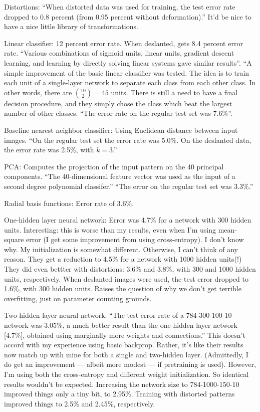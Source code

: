 \documentclass[12pt]{report}
\begin{document}
Distortions: ``When distorted data was used for training, the test
error rate dropped to 0.8 percent (from 0.95 percent without
deformation).''  It'd be nice to have a nice little library of
transformations.

Linear classifier: 12 percent error rate. When deslanted, gets 8.4
percent error rate.  ``Various combinations of sigmoid units, linear
units, gradient descent learning, and learning by directly solving
linear systems gave similar results''.  ``A simple improvement of the
basic linear classifier was tested.  The idea is to train each unit of
a single-layer network to separate each class from each other class.
In other words, there are ${10 \choose 2} = 45$ units.  There is still
a need to have a final decision procedure, and they simply chose the
class which beat the largest number of other classes.  ``The error
rate on the regular test set was 7.6\%''.

Baseline nearest neighbor classifier: Using Euclidean distance between
input images.  ``On the regular test set the error rate was 5.0\%.  On
the deslanted data, the error rate was 2.5\%, with $k = 3$.''

PCA: Computes the projection of the input pattern on the 40 principal
components.  ``The 40-dimensional feature vector was used as the input
of a second degree polynomial classifer.''  ``The error on the regular
test set was 3.3\%.''

Radial basis functions: Error rate of 3.6\%.

One-hidden layer neural network: Error was 4.7\% for a network with
300 hidden units.  Interesting: this is worse than my results, even
when I'm using mean-square error (I get some improvement from using
cross-entropy).  I don't know why.  My initialization is somewhat
different.  Otherwise, I can't think of any reason.  They get a
reduction to 4.5\% for a network with 1000 hidden units(!)  They did
even bettter with distortions: 3.6\% and 3.8\%, with 300 and 1000
hidden units, respectively.  When deslanted images were used, the test
error dropped to 1.6\%, with 300 hidden units.  Raises the question of
why we don't get terrible overfitting, just on parameter counting
grounds.

Two-hidden layer neural network: ``The test error rate of a
784-300-100-10 network was 3.05\%, a much better result than the
one-hidden layer network [4.7\%], obtained using marginally more
weights and connections.''  This doesn't accord with my experience
using basic backprop.  Rather, it's like their results now match up
with mine for both a single and two-hidden layer.  (Admittedly, I do
get an improvement --- albeit more modest --- if pretraining is used).
However, I'm using both the cross-entropy and different weight
initialization.  So identical results wouldn't be expected.
Increasing the network size to 784-1000-150-10 improved things only a
tiny bit, to 2.95\%.  Training with distorted patterns improved things
to 2.5\% and 2.45\%, respectively.  
\end{document}
